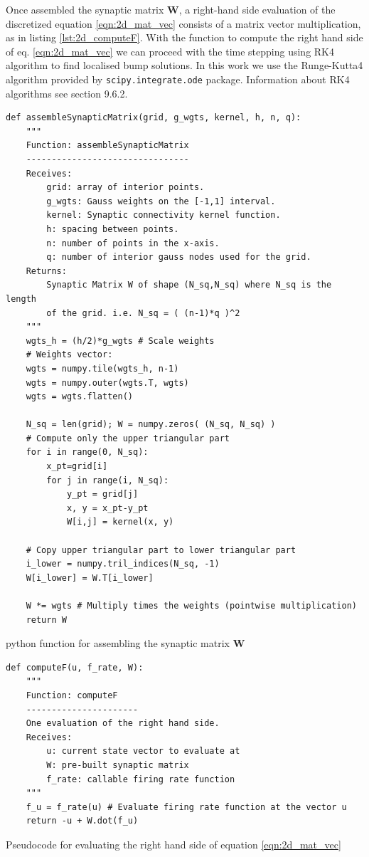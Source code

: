 \documentclass{uonmathreport}
\begin{document}
Once assembled the synaptic matrix $\mathbf{W}$, a right-hand side evaluation of the discretized equation \ref{eqn:2d_mat_vec} consists of a matrix vector multiplication, as in listing \ref{lst:2d_computeF}. With the function to compute the right hand side of eq. \ref{eqn:2d_mat_vec} we can proceed with the time stepping using RK4 algorithm to find localised bump solutions. In this work we use the Runge-Kutta4 algorithm provided by \texttt{scipy.integrate.ode} package. Information about RK4 algorithms see \cite{heath2002scientific} section 9.6.2.
\begin{listing}[H]
		\begin{verbatim}
def assembleSynapticMatrix(grid, g_wgts, kernel, h, n, q):
	"""
	Function: assembleSynapticMatrix
	--------------------------------
	Receives:
		grid: array of interior points.
		g_wgts: Gauss weights on the [-1,1] interval.
		kernel: Synaptic connectivity kernel function.
		h: spacing between points.
		n: number of points in the x-axis.
		q: number of interior gauss nodes used for the grid.
	Returns:
		Synaptic Matrix W of shape (N_sq,N_sq) where N_sq is the length
		of the grid. i.e. N_sq = ( (n-1)*q )^2
	"""
	wgts_h = (h/2)*g_wgts # Scale weights
	# Weights vector:
	wgts = numpy.tile(wgts_h, n-1)
	wgts = numpy.outer(wgts.T, wgts)
	wgts = wgts.flatten()
	
	N_sq = len(grid); W = numpy.zeros( (N_sq, N_sq) )
	# Compute only the upper triangular part
	for i in range(0, N_sq):
		x_pt=grid[i]
		for j in range(i, N_sq):
			y_pt = grid[j]
			x, y = x_pt-y_pt
			W[i,j] = kernel(x, y)
	
	# Copy upper triangular part to lower triangular part
	i_lower = numpy.tril_indices(N_sq, -1)
	W[i_lower] = W.T[i_lower]
	
	W *= wgts # Multiply times the weights (pointwise multiplication)
	return W
		\end{verbatim}	
	\caption{python function for assembling the synaptic matrix $\textbf{W}$}
	\label{lst:2d_synap_mat}
\end{listing}
\begin{listing}[H]
	\begin{center}
		\begin{verbatim}
def computeF(u, f_rate, W):
	"""
	Function: computeF
	----------------------
	One evaluation of the right hand side.
	Receives:
		u: current state vector to evaluate at
		W: pre-built synaptic matrix
		f_rate: callable firing rate function
	"""
	f_u = f_rate(u) # Evaluate firing rate function at the vector u
	return -u + W.dot(f_u)
		\end{verbatim}	
	\end{center}
	\caption{Pseudocode for evaluating the right hand side of equation \ref{eqn:2d_mat_vec}}
	\label{lst:2d_computeF}
\end{listing}
\end{document}
